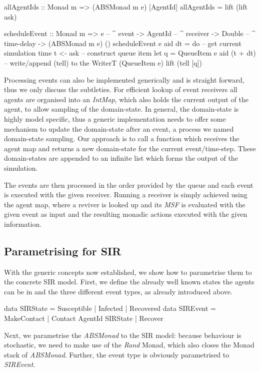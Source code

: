 \begin{HaskellCode}
allAgentIds :: Monad m => (ABSMonad m e) [AgentId]
allAgentIds = lift (lift ask)

scheduleEvent :: Monad m
              => e        -- ^ event
              -> AgentId  -- ^ receiver
              -> Double   -- ^ time-delay
              -> (ABSMonad m e) ()
scheduleEvent e aid dt = do
  -- get current simulation time
  t <- ask
  -- construct queue item
  let q = QueueItem e aid (t + dt)
  -- write/append (tell) to the WriterT (QueueItem e)
  lift (tell [q])
\end{HaskellCode}

Processing events can also be implemented generically and is straight forward, thus we only discuss the subtleties. For efficient lookup of event receivers all agents are organised into an \textit{IntMap}, which also holds the current output of the agent, to allow sampling of the domain-state. In general, the domain-state is highly model specific, thus a generic implementation needs to offer some mechanism to update the domain-state after an event, a process we named domain-state sampling. Our approach is to call a function which receives the agent map and returns a new domain-state for the current event/time-step. These domain-states are appended to an infinite list which forms the output of the simulation.

The events are then processed in the order provided by the queue and each event is executed with the given receiver. Running a receiver is simply achieved using the agent map, where a reviver is looked up and its \textit{MSF} is evaluated with the given event as input and the resulting monadic actions executed with the given information.
 
\subsection{Parametrising for SIR}
With the generic concepts now established, we show how to parametrise them to the concrete SIR model. First, we define the already well known states the agents can be in and the three different event types, as already introduced above.

\begin{HaskellCode}
data SIRState = Susceptible | Infected | Recovered
data SIREvent = MakeContact | Contact AgentId SIRState | Recover 
\end{HaskellCode}

Next, we parametrise the \textit{ABSMonad} to the SIR model: because behaviour is stochastic, we need to make use of the \textit{Rand} Monad, which also closes the Monad stack of \textit{ABSMonad}. Further, the event type is obviously parametrised to \textit{SIREvent}.

